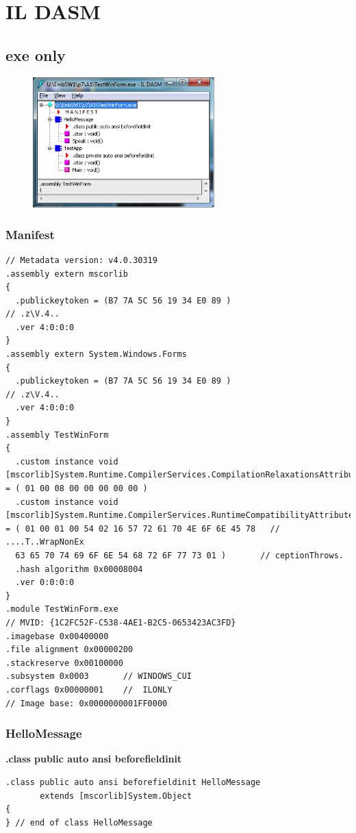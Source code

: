\section{IL DASM}
\subsection{exe only}
\begin{figure}[htbp]
	\centering
	\includegraphics[width=7cm]{images/ILDASM_exe.png}
\end{figure}

\subsubsection{Manifest}
\begin{lstlisting}[style=Csharp]
// Metadata version: v4.0.30319
.assembly extern mscorlib
{
  .publickeytoken = (B7 7A 5C 56 19 34 E0 89 )                         // .z\V.4..
  .ver 4:0:0:0
}
.assembly extern System.Windows.Forms
{
  .publickeytoken = (B7 7A 5C 56 19 34 E0 89 )                         // .z\V.4..
  .ver 4:0:0:0
}
.assembly TestWinForm
{
  .custom instance void [mscorlib]System.Runtime.CompilerServices.CompilationRelaxationsAttribute::.ctor(int32) = ( 01 00 08 00 00 00 00 00 ) 
  .custom instance void [mscorlib]System.Runtime.CompilerServices.RuntimeCompatibilityAttribute::.ctor() = ( 01 00 01 00 54 02 16 57 72 61 70 4E 6F 6E 45 78   // ....T..WrapNonEx
  63 65 70 74 69 6F 6E 54 68 72 6F 77 73 01 )       // ceptionThrows.
  .hash algorithm 0x00008004
  .ver 0:0:0:0
}
.module TestWinForm.exe
// MVID: {1C2FC52F-C538-4AE1-B2C5-0653423AC3FD}
.imagebase 0x00400000
.file alignment 0x00000200
.stackreserve 0x00100000
.subsystem 0x0003       // WINDOWS_CUI
.corflags 0x00000001    //  ILONLY
// Image base: 0x0000000001FF0000
\end{lstlisting}

\subsubsection{HelloMessage}
\textbf{.class public auto ansi beforefieldinit}
\begin{lstlisting}[style=Csharp]
.class public auto ansi beforefieldinit HelloMessage
       extends [mscorlib]System.Object
{
} // end of class HelloMessage
\end{lstlisting}

